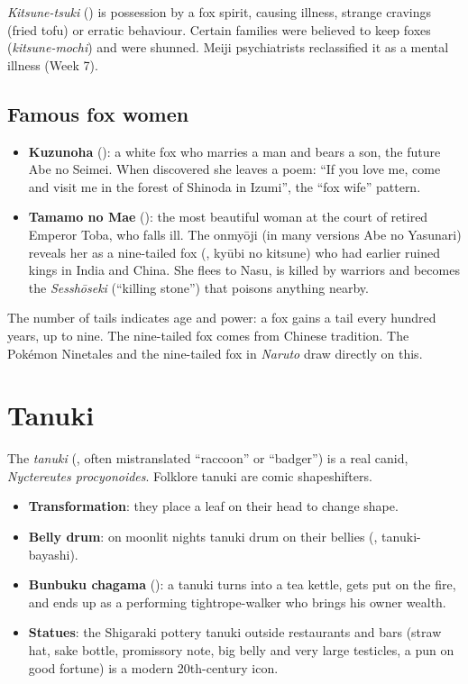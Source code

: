 \begin{definition}
\emph{Kitsune-tsuki} () is possession by a fox spirit, causing illness, strange
cravings (fried tofu) or erratic behaviour. Certain families were believed to keep foxes
(\emph{kitsune-mochi}) and were shunned. Meiji psychiatrists reclassified it as a mental
illness (Week 7).
\end{definition}

\subsection{Famous fox women}

\begin{itemize}
  \item \textbf{Kuzunoha} (): a white fox who marries a man and bears a son, the
        future Abe no Seimei. When discovered she leaves a poem: ``If you love me, come and
        visit me in the forest of Shinoda in Izumi'', the ``fox wife'' pattern.
  \item \textbf{Tamamo no Mae} (): the most beautiful woman at the court of
        retired Emperor Toba, who falls ill. The onmyōji (in many versions Abe no Yasunari)
        reveals her as a nine-tailed fox (, kyūbi no kitsune) who had earlier
        ruined kings in India and China. She flees to Nasu, is killed by warriors and
        becomes the \emph{Sesshōseki} (``killing stone'') that poisons anything nearby.
\end{itemize}

\begin{remark}
The number of tails indicates age and power: a fox gains a tail every hundred years, up to
nine. The nine-tailed fox comes from Chinese tradition. The Pokémon Ninetales and the
nine-tailed fox in \emph{Naruto} draw directly on this.
\end{remark}


\section{Tanuki}

The \emph{tanuki} (, often mistranslated ``raccoon'' or ``badger'') is a real canid,
\emph{Nyctereutes procyonoides}. Folklore tanuki are comic shapeshifters.

\begin{itemize}
  \item \textbf{Transformation}: they place a leaf on their head to change shape.
  \item \textbf{Belly drum}: on moonlit nights tanuki drum on their bellies
        (, tanuki-bayashi).
  \item \textbf{Bunbuku chagama} (): a tanuki turns into a tea kettle, gets
        put on the fire, and ends up as a performing tightrope-walker who brings his owner
        wealth.
  \item \textbf{Statues}: the Shigaraki pottery tanuki outside restaurants and bars (straw
        hat, sake bottle, promissory note, big belly and very large testicles, a pun on
        good fortune) is a modern 20th-century icon.
\end{itemize}

